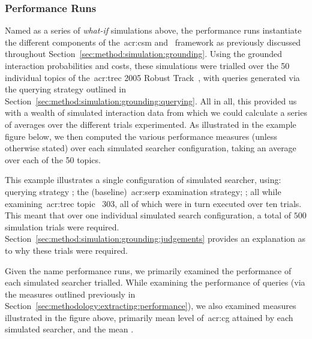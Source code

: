 \subsubsection{Performance Runs}\label{sec:method:simulation:runs:performance}
Named as a series of \emph{what-if} simulations above, the performance runs instantiate the different components of the~\gls{acr:csm} and \simiir~framework as previously discussed throughout Section~\ref{sec:method:simulation:grounding}. Using the grounded interaction probabilities and costs, these simulations were trialled over the 50 individual topics of the~\gls{acr:trec} 2005 Robust Track~\citep{voorhees2006trec_robust}, with queries generated via the querying strategy outlined in Section~\ref{sec:method:simulation:grounding:querying}. All in all, this provided us with a wealth of simulated interaction data from which we could calculate a series of averages over the different trials experimented. As illustrated in the example figure below, we then computed the various performance measures (unless otherwise stated) over each simulated searcher configuration, taking an average over each of the 50 topics.

\begin{figure}[h]
    \centering
    \vspace*{-6mm}
\end{figure}

This example illustrates a single configuration of simulated searcher, using: querying strategy ; the  (baseline)~\gls{acr:serp} examination strategy;
; all while examining~\gls{acr:trec} topic \textnumero~303, all of which were in turn executed over ten trials. This meant that over one individual simulated search configuration, a total of $500$ simulation trials were required. Section~\ref{sec:method:simulation:grounding:judgements} provides an explanation as to why these trials were required.

Given the name performance runs, we primarily examined the performance of each simulated searcher trialled. While examining the performance of queries (via the measures outlined previously in Section~\ref{sec:methodology:extracting:performance}), we also examined measures illustrated in the figure above, primarily mean level of~\gls{acr:cg} attained by each simulated searcher, and the mean .

